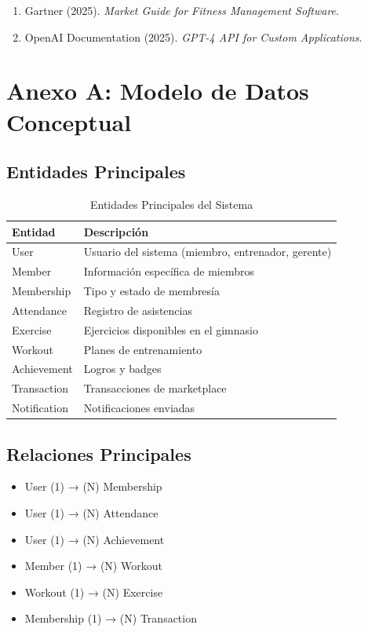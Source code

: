 \documentclass[11pt,a4paper]{article}
\begin{document}
\begin{itemize}
\begin{enumerate}
    \item Gartner (2025). \textit{Market Guide for Fitness Management Software}.

    \item OpenAI Documentation (2025). \textit{GPT-4 API for Custom Applications}.
\end{enumerate}

\newpage
\appendix

\section{Anexo A: Modelo de Datos Conceptual}

\subsection{Entidades Principales}

\begin{table}[H]
\centering
\caption{Entidades Principales del Sistema}
\begin{tabular}{|l|l|}
\hline
\textbf{Entidad} & \textbf{Descripción} \\ \hline
User & Usuario del sistema (miembro, entrenador, gerente) \\ \hline
Member & Información específica de miembros \\ \hline
Membership & Tipo y estado de membresía \\ \hline
Attendance & Registro de asistencias \\ \hline
Exercise & Ejercicios disponibles en el gimnasio \\ \hline
Workout & Planes de entrenamiento \\ \hline
Achievement & Logros y badges \\ \hline
Transaction & Transacciones de marketplace \\ \hline
Notification & Notificaciones enviadas \\ \hline
\end{tabular}
\end{table}

\subsection{Relaciones Principales}

\begin{itemize}
    \item User (1) → (N) Membership
    \item User (1) → (N) Attendance
    \item User (1) → (N) Achievement
    \item Member (1) → (N) Workout
    \item Workout (1) → (N) Exercise
    \item Membership (1) → (N) Transaction
\end{itemize}


\end{itemize}
\end{document}
